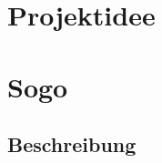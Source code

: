 \documentclass[a4paper]{scrartcl}
\begin{document}
\newpage

%
%

\thispagestyle{empty}

\tableofcontents

\newpage

%
%

\setcounter{page}{3}
\section*{Projektidee}

\section{Sogo}
\subsection{Beschreibung}
\end{document}
